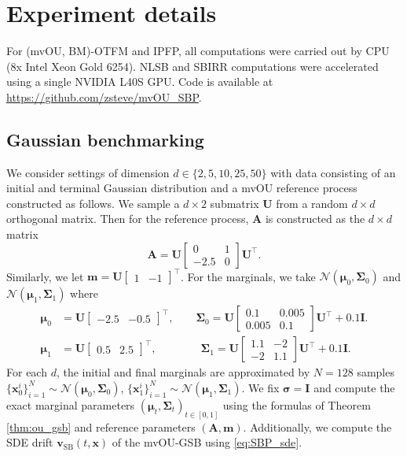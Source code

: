 \documentclass{article}
\newcommand{\Id}{\mathbf{I}}
\newcommand{\Nc}{\mathcal{N}}
\theoremstyle{newstyle}
\begin{document}
\section{Experiment details}

For (mvOU, BM)-OTFM and IPFP, all computations were carried out by CPU (8x Intel Xeon Gold 6254). NLSB and SBIRR computations were accelerated using a single NVIDIA L40S GPU. Code is available at \url{https://github.com/zsteve/mvOU_SBP}.

\subsection{Gaussian benchmarking}

We consider settings of dimension $d \in \{ 2, 5, 10, 25, 50 \}$ with data consisting of an initial and terminal Gaussian distribution and a mvOU reference process constructed as follows. We sample a $d \times 2$ submatrix $\bm{U}$ from a random $d \times d$ orthogonal matrix. Then for the reference process, $\bm{A}$ is constructed as the $d \times d$ matrix 
\[
  \bm{A} = \bm{U} \begin{bmatrix} 0 & 1 \\ -2.5 & 0 \end{bmatrix} \bm{U}^\top . 
\]
Similarly, we let $\bm{m} = \bm{U} \begin{bmatrix} 1 & -1 \end{bmatrix}^\top$. For the marginals, we take $\Nc(\bm{\mu}_0, \bm{\Sigma}_0)$ and $\Nc(\bm{\mu}_1, \bm{\Sigma}_1)$ where
\begin{align*}
  \bm{\mu}_0 &= \bm{U} \begin{bmatrix} -2.5 &  -0.5 \end{bmatrix}^\top, \qquad \bm{\Sigma}_0 = \bm{U} \begin{bmatrix} 0.1 & 0.005 \\ 0.005 & 0.1 \end{bmatrix} \bm{U}^\top + 0.1 \Id. \\
  \bm{\mu}_1 &= \bm{U} \begin{bmatrix} 0.5 & 2.5 \end{bmatrix}^\top, \qquad\qquad \bm{\Sigma}_1 = \bm{U} \begin{bmatrix} 1.1 & -2 \\ -2 & 1.1 \end{bmatrix} \bm{U}^\top + 0.1 \Id.
\end{align*}
For each $d$, the initial and final marginals are approximated by $N = 128$ samples $\{ \bm{x}_0^{i} \}_{i = 1}^{N} \sim \Nc(\bm{\mu}_0, \bm{\Sigma}_0)$, $\{ \bm{x}_1^{i} \}_{i = 1}^{N} \sim \Nc(\bm{\mu}_1, \bm{\Sigma}_1)$. We fix $\bm{\sigma} = \bm{I}$ and compute the exact marginal parameters $(\bm{\mu}_t, \bm{\Sigma}_t)_{t \in [0, 1]}$ using the formulas of Theorem \ref{thm:ou_gsb} and reference parameters $(\bm{A}, \bm{m})$. Additionally, we compute the SDE drift $\bm{v}_{\mathrm{SB}}(t, \bm{x})$ of the mvOU-GSB using \eqref{eq:SBP_sde}.
\end{document}
